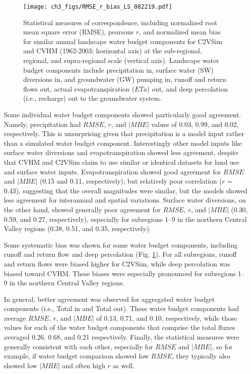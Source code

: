 \begin{figure}[ht!]
\centerline{\texttt{[image: ch3\_figs/RMSE\_r\_bias\_LS\_082219.pdf]}}
\caption{Statistical measures of correspondence, including normalized root mean square error (RMSE), pearsons $r$, and normalized mean bias for similar annual landscape water budget components for C2VSim and CVHM (1962-2003; horizontal axis) at the sub-regional, regional, and supra-regional scale (vertical axis). Landscape water budget components include precipitation in, surface water (SW) diversions in, and groundwater (GW) pumping in, runoff and return flows out, actual evapotranspiration ($ETa$) out, and deep percolation (i.e., recharge) out to the groundwater system.}
\label{fig:ch3_LS_components}
\end{figure}

Some individual water budget components showed particularly good agreement. Namely, precipitation had $RMSE$, $r$, and $|MBE|$ values of 0.03, 0.99, and 0.02, respectively. This is unsurprising given that precipitation is a model input rather than a simulated water budget component. Interestingly other model inputs like surface water diversions and evapotranspiration showed less agreement, despite that CVHM and C2VSim claim to use similar or identical datasets for land use and surface water inputs. Evapotranspiration showed good agreement for $RMSE$ and $|MBE|$ (0.15 and 0.11, respectively), but relatively poor correlation ($r$ = 0.43), suggesting that the overall magnitudes were similar, but the models showed less agreement for interannual and spatial variations. Surface water diversions, on the other hand, showed generally poor agreement for $RMSE$, $r$, and $|MBE|$ (0.30, 0.59, and 0.27, respectively), especially for subregions 1--9 in the northern Central Valley regions (0.38, 0.51, and 0.35, respectively).

Some systematic bias was shown for some water budget components, including runoff and return flow and deep percolation (Fig. \ref{fig:ch3_LS_components}). For all subregions, runoff and return flows were biased higher for C2VSim, while deep percolation was biased toward CVHM. These biases were especially pronounced for subregions 1--9 in the northern Central Valley regions.

In general, better agreement was observed for aggregated water budget components (i.e., Total in and Total out). These water budget components had  average $RMSE$, $r$, and $|MBE|$ of 0.13, 0.71, and 0.10, respectively, while those values for each of the water budget components that comprise the total fluxes averaged 0.26, 0.68, and 0.21 respectively. Finally, the statistical measures were generally consistent with each other, especially for $RMSE$ and $|MBE|$, so for example, if water budget comparison showed low $RMSE$, they typically also showed low $|MBE|$ and often high $r$ as well.


